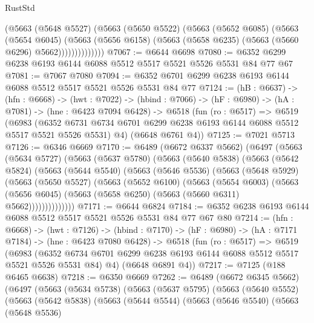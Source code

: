 \begin{lexlean}{RustStd}
\begin{coremodule}
                  (@5663
                    (@5648 @5527)
                    (@5663
                      (@5650 @5522)
                      (@5663
                        (@5652 @6085)
                        (@5663
                          (@5654 @6045)
                          (@5663
                            (@5656 @6158)
                            (@5663 (@5658 @6235) (@5663 (@5660 @6296) @5662))))))))))))))
@7067 := @6644 @6698
@7080 := @6352 @6299 @6238 @6193 @6144 @6088 @5512 @5517 @5521 @5526 @5531 @84 @77 @67
@7081 := @7067 @7080
@7094 := @6352 @6701 @6299 @6238 @6193 @6144 @6088 @5512 @5517 @5521 @5526 @5531 @84 @77
@7124 := (hB : @6637) ->
  (hfn : @6668) ->
  (hwt : @7022) ->
  (hbind : @7066) ->
  (hF : @6980) ->
  (hA : @7081) ->
  (hne : @6423 @7094 @6428) ->
  @6518
    (fun (ro : @6517) =>
    @6519
      (@6983
        (@6352 @6731 @6734 @6701 @6299 @6238 @6193 @6144 @6088 @5512 @5517 @5521 @5526 @5531)
        @4)
      (@6648 @6761 @4))
@7125 := @7021 @5713
@7126 := @6346 @6669
@7170 := @6489
    (@6672 @6337 @5662)
    (@6497
      (@5663
        (@5634 @5727)
        (@5663
          (@5637 @5780)
          (@5663
            (@5640 @5838)
            (@5663
              (@5642 @5824)
              (@5663
                (@5644 @5540)
                (@5663
                  (@5646 @5536)
                  (@5663
                    (@5648 @5929)
                    (@5663
                      (@5650 @5527)
                      (@5663
                        (@5652 @6100)
                        (@5663
                          (@5654 @6003)
                          (@5663
                            (@5656 @6045)
                            (@5663 (@5658 @6250) (@5663 (@5660 @6311) @5662))))))))))))))
@7171 := @6644 @6824
@7184 := @6352 @6238 @6193 @6144 @6088 @5512 @5517 @5521 @5526 @5531 @84 @77 @67 @80
@7214 := (hfn : @6668) ->
  (hwt : @7126) ->
  (hbind : @7170) ->
  (hF : @6980) ->
  (hA : @7171 @7184) ->
  (hne : @6423 @7080 @6428) ->
  @6518
    (fun (ro : @6517) =>
    @6519
      (@6983 (@6352 @6734 @6701 @6299 @6238 @6193 @6144 @6088 @5512 @5517 @5521 @5526 @5531 @84) @4)
      (@6648 @6891 @4))
@7217 := @7125 (@188 @6465 @6638)
@7218 := @6350 @6669
@7262 := @6489
    (@6672 @6345 @5662)
    (@6497
      (@5663
        (@5634 @5738)
        (@5663
          (@5637 @5795)
          (@5663
            (@5640 @5552)
            (@5663
              (@5642 @5838)
              (@5663
                (@5644 @5544)
                (@5663
                  (@5646 @5540)
                  (@5663
                    (@5648 @5536)

\end{coremodule}
\end{lexlean}
